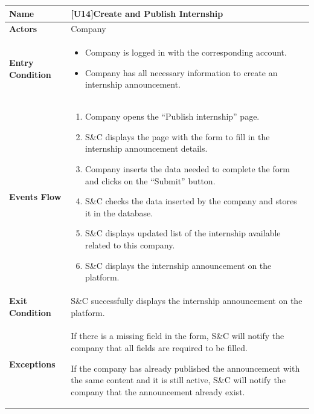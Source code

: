 \begin{center}
    \begin{tabular}{|p{9em}|p{27em}|}
        \hline
        \rowcolor{bluepoli!40} %
        \textbf{Name} & \textbf{[U14]Create and Publish Internship} \\
        \hline
        \textbf{Actors} & Company \\
        \hline
        \textbf{Entry Condition} & 
        \begin{itemize}
            \item Company is logged in with the corresponding account.
            \item Company has all necessary information to create an internship announcement.
        \end{itemize} \\
        \hline
        \textbf{Events Flow} & 
        \begin{enumerate}
            \item Company opens the ``Publish internship'' page.
            \item S\&C displays the page with the form to fill in the internship announcement details.
            \item Company inserts the data needed to complete the form and clicks on the ``Submit'' button.
            \item S\&C checks the data inserted by the company and stores it in the database.
            \item S\&C displays updated list of the internship available related to this company.
            \item S\&C displays the internship announcement on the platform.
        \end{enumerate} \\
        \hline
        \textbf{Exit Condition} & 
        S\&C successfully displays the internship announcement on the platform.\\
        \hline
        \textbf{Exceptions} &
        If there is a missing field in the form, S\&C will notify the company that all fields are required to be filled.

        If the company has already published the announcement with the same content and it is still active, S\&C will notify the company
        that the announcement already exist.\\
        \hline
    \end{tabular}
\end{center}

